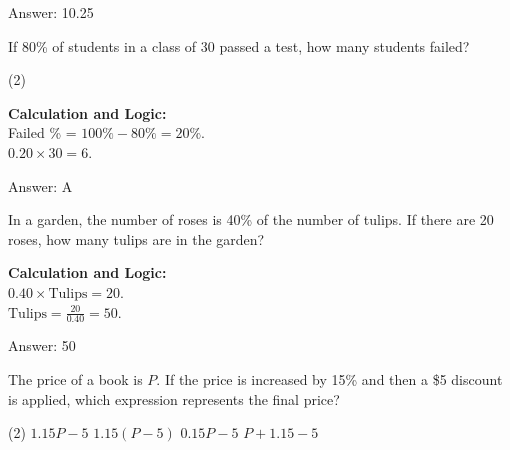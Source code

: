 \documentclass[11pt,paper=a4,answers]{exam}
\begin{document}
\begin{questions}
\begin{solution}
\vspace{30pt}

Answer: \colorbox{yellow!100}{10.25}
\end{solution}

\vspace{60pt}

\question
If 80\% of students in a class of 30 passed a test, how many students failed?
\begin{tasks}(2)
\end{tasks}

\begin{solution}
\textbf{Calculation and Logic:} \\
Failed \% = $100\% - 80\% = 20\%$. \\
$0.20 \times 30 = 6$.

\vspace{30pt}

Answer: \colorbox{yellow!100}{A}
\end{solution}

\vspace{60pt}

\question
In a garden, the number of roses is 40\% of the number of tulips. If there are 20 roses, how many tulips are in the garden?

\begin{solution}
\textbf{Calculation and Logic:} \\
$0.40 \times \text{Tulips} = 20$. \\
$\text{Tulips} = \frac{20}{0.40} = 50$.

\vspace{30pt}

Answer: \colorbox{yellow!100}{50}
\end{solution}

\vspace{60pt}

\question
The price of a book is $P$. If the price is increased by 15\% and then a \$5 discount is applied, which expression represents the final price?
\begin{tasks}(2)
    \task $1.15P - 5$
    \task $1.15(P - 5)$
    \task $0.15P - 5$
    \task $P + 1.15 - 5$
\end{tasks}


\end{questions}
\end{document}
